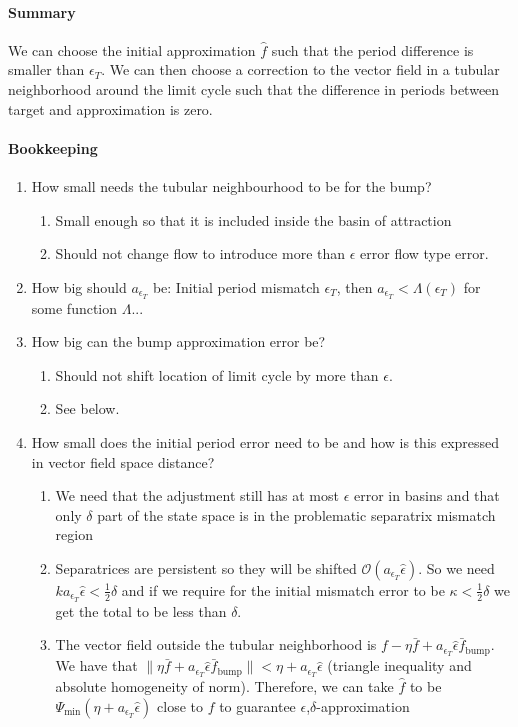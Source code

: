 \documentclass{article}
\theoremstyle{definition} \newtheorem{definition}{Definition}
\theoremstyle{remark} \newtheorem{remark}{Remark}
\newcounter{ct}
\begin{document}
\paragraph{Summary}
We can choose the initial approximation $\hat{f}$ such that the period difference is smaller than $\epsilon_T$.
We can then choose a correction to the vector field in a tubular neighborhood around the limit cycle such that the difference in periods between target and approximation is zero.


\paragraph{Bookkeeping}
\begin{enumerate}
\item How small needs the tubular neighbourhood to be for the bump? 
\begin{enumerate}
\item Small enough so that it is included inside the basin of attraction
\item Should not change flow to introduce more than $\epsilon$ error flow type error.
\end{enumerate}
\item How big should $a_{\epsilon_T}$ be: Initial period mismatch $\epsilon_T$, then $a_{\epsilon_T}< \Lambda(\epsilon_T)$ for some function $\Lambda$...
\item How big can the bump approximation error be?
\begin{enumerate}
\item Should not shift location of limit cycle by more than $\epsilon$.
\item See below.
\end{enumerate}
\item How small does the initial period error need to be and how is this expressed in vector field space distance?
\begin{enumerate}
\item We need that the adjustment still has at most $\epsilon$ error in basins and that only $\delta$ part of the state space is in the problematic separatrix mismatch region
\item Separatrices are persistent so they will be shifted $\mathcal{O}(a_{\epsilon_T}\hat \epsilon)$. So we need $ka_{\epsilon_T}\hat \epsilon < \tfrac{1}{2}\delta$ and if we require for the initial mismatch error to be $\kappa<\tfrac{1}{2}\delta$ we get the total to be less than $\delta$. 
\item The vector field outside the tubular neighborhood is $f - \eta\bar f  + a_{\epsilon_T}\hat \epsilon\bar f_{\operatorname{bump}}$. 
We have that $\|\eta\bar f  + a_{\epsilon_T}\hat \epsilon\bar f_{\operatorname{bump}}\| < \eta + a_{\epsilon_T}\hat \epsilon$ (triangle inequality and absolute homogeneity of norm). Therefore, we can take $\hat f$ to be  $\Psi_{\min}(\eta + a_{\epsilon_T}\hat \epsilon)$ close to $f$ to guarantee $\epsilon$,$\delta$-approximation
\end{enumerate}
\end{enumerate}
\end{document}
